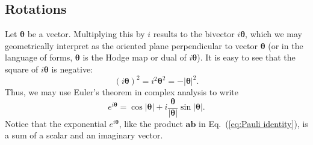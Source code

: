 \documentclass[11pt,twocolumn]{article}
\begin{document}
\subsection{Rotations}

Let $\bm\theta$ be a vector.  Multiplying this by $i$ results to the bivector $i\bm\theta$, which we may geometrically interpret as the oriented plane perpendicular to vector $\bm\theta$ (or in the language of forms, $\bm\theta$ is the Hodge map or dual of $i\bm\theta$).  It is easy to see that the square of $i\bm\theta$ is negative:
\begin{equation}
\label{eq:i theta squared}
(i\bm\theta)^2=i^2{\bm\theta}^2=-|{\bm\theta}|^2.
\end{equation}
Thus, we may use Euler's theorem in complex analysis to write
\begin{equation}
\label{eq:Euler theorem}
e^{i\bm\theta}=\cos|{\bm\theta}|+i\frac{\bm\theta}{|{\bm\theta}|}\sin|{\bm\theta}|.
\end{equation}
Notice that the exponential $e^{i\bm\theta}$, like the product $\mathbf a\mathbf b$ in Eq.~(\ref{eq:Pauli identity}), is a sum of a scalar and an imaginary vector.
\end{document}
